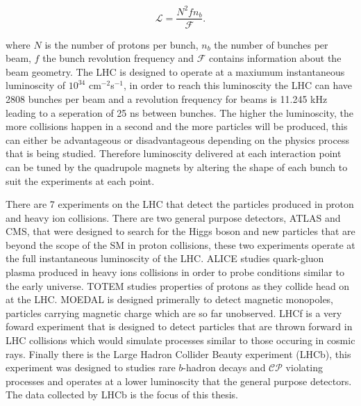 \begin{equation}
\mathcal{L} = \frac{N^{2} f n_{b}}{\mathcal{F}}.
\label{eq:inst_lumi}
\end{equation}

where $N$ is the number of protons per bunch, $n_{b}$ the number of bunches per beam, $f$ the bunch revolution frequency and $\mathcal{F}$ contains information about the beam geometry. The LHC is designed to operate at a maxiumum instantaneous luminoscity of $10^{34}$ cm$^{-2}$s$^{-1}$, in order to reach this luminoscity the LHC can have 2808 bunches per beam and a revolution frequency for beams is 11.245 kHz leading to a seperation of 25 ns between bunches. The higher the luminoscity, the more collisions happen in a second and the more particles will be produced, this can either be advantageous or disadvantageous depending on the physics process that is being studied.
Therefore luminoscity delivered at each interaction point can be tuned by the quadrupole magnets by altering the shape of each bunch to suit the experiments at each point.



There are 7 experiments on the LHC that detect the particles produced in proton and heavy ion collisions. There are two general purpose detectors, ATLAS and CMS, that were designed to search for the Higgs boson and new particles that are beyond the scope of the SM in proton collisions, these two experiments operate at the full instantaneous luminoscity of the LHC. %
ALICE studies quark-gluon plasma produced in heavy ions collisions in order to probe conditions similar to the early universe. TOTEM studies properties of protons as they collide head on at the LHC. MOEDAL is designed primerally to detect magnetic monopoles, particles carrying magnetic charge which are so far unobserved. LHCf is a very foward experiment that is designed to detect particles that are thrown forward in LHC collisions which would simulate processes similar to those occuring in cosmic rays. Finally there is the Large Hadron Collider Beauty experiment (LHCb), this experiment was designed to studies rare $b$-hadron decays and $\mathcal{CP}$ violating processes and operates at a lower luminoscity that the general purpose detectors. The data collected by LHCb is the focus of this thesis.





